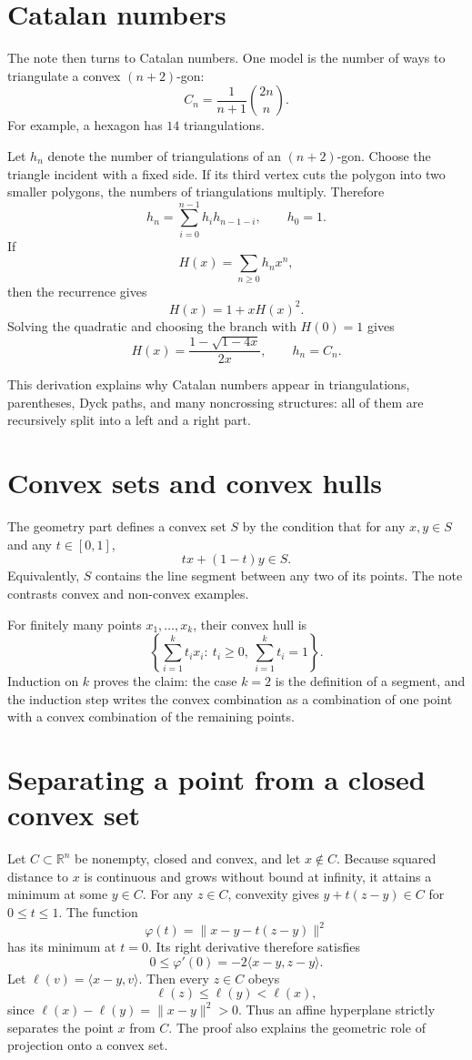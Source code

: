 \section{Catalan numbers}

The note then turns to Catalan numbers.  One model is the number of ways to triangulate a convex $(n+2)$-gon:
\[
  C_n=\frac1{n+1}\binom{2n}{n}.
\]
For example, a hexagon has $14$ triangulations.

Let $h_n$ denote the number of triangulations of an $(n+2)$-gon.  Choose the triangle incident with a fixed side.  If its third vertex cuts the polygon into two smaller polygons, the numbers of triangulations multiply.  Therefore
\[
  h_n=\sum_{i=0}^{n-1}h_i h_{n-1-i},\qquad h_0=1.
\]
If
\[
  H(x)=\sum_{n\ge0}h_nx^n,
\]
then the recurrence gives
\[
  H(x)=1+xH(x)^2.
\]
Solving the quadratic and choosing the branch with $H(0)=1$ gives
\[
  H(x)=\frac{1-\sqrt{1-4x}}{2x},\qquad
  h_n=C_n.
\]

This derivation explains why Catalan numbers appear in triangulations, parentheses, Dyck paths, and many noncrossing structures: all of them are recursively split into a left and a right part.

\section{Convex sets and convex hulls}

The geometry part defines a convex set $S$ by the condition that for any $x,y\in S$ and any $t\in[0,1]$,
\[
  tx+(1-t)y\in S.
\]
Equivalently, $S$ contains the line segment between any two of its points.  The note contrasts convex and non-convex examples.

For finitely many points $x_1,\ldots,x_k$, their convex hull is
\[
  \left\{\sum_{i=1}^k t_ix_i:\ t_i\ge0,\ \sum_{i=1}^k t_i=1\right\}.
\]
Induction on $k$ proves the claim: the case $k=2$ is the definition of a segment, and the induction step writes the convex combination as a combination of one point with a convex combination of the remaining points.

\section{Separating a point from a closed convex set}

Let \(C\subset\mathbb R^n\) be nonempty, closed and convex, and let \(x\notin C\). Because squared distance to \(x\) is continuous and grows without bound at infinity, it attains a minimum at some \(y\in C\). For any \(z\in C\), convexity gives \(y+t(z-y)\in C\) for \(0\le t\le1\). The function
\[
 \varphi(t)=\|x-y-t(z-y)\|^2
\]
has its minimum at \(t=0\). Its right derivative therefore satisfies
\[
 0\le \varphi'(0)=-2\langle x-y,z-y\rangle.
\]
Let \(\ell(v)=\langle x-y,v\rangle\). Then every \(z\in C\) obeys
\[
 \ell(z)\le\ell(y)<\ell(x),
\]
since \(\ell(x)-\ell(y)=\|x-y\|^2>0\). Thus an affine hyperplane strictly separates the point \(x\) from \(C\). The proof also explains the geometric role of projection onto a convex set.

